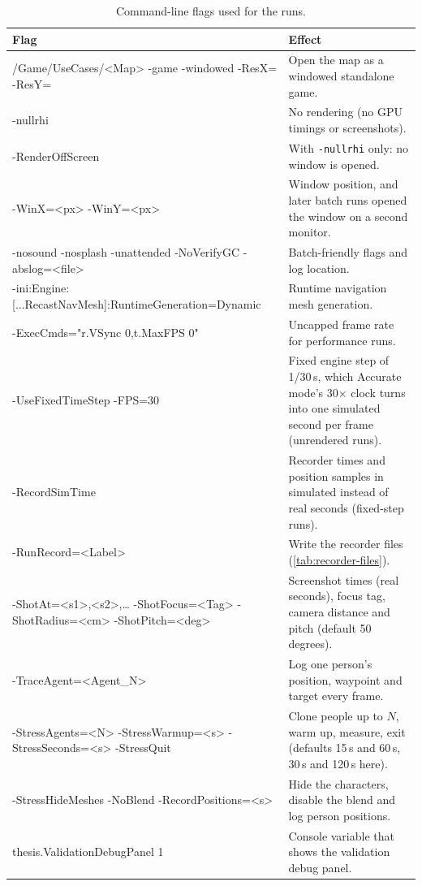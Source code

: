 \begin{table}[H]
\centering
\footnotesize
\begin{tabularx}{\textwidth}{|>{\raggedright\arraybackslash\ttfamily}p{}|>{\raggedright\arraybackslash}X|}
\hline
\rowcolor{headgray}\textbf{\rmfamily Flag} & \textbf{Effect} \\
\hline
/Game/UseCases/<Map> -game -windowed -ResX= -ResY= & Open the map as a windowed standalone game. \\ \hline
-nullrhi & No rendering (no GPU timings or screenshots). \\ \hline
-RenderOffScreen & With \texttt{-nullrhi} only: no window is opened. \\ \hline
-WinX=<px> -WinY=<px> & Window position, and later batch runs opened the window on a second monitor. \\ \hline
-nosound -nosplash -unattended -NoVerifyGC -abslog=<file> & Batch-friendly flags and log location. \\ \hline
-ini:Engine:[...RecastNavMesh]:\allowbreak RuntimeGeneration=Dynamic & Runtime navigation mesh generation. \\ \hline
-ExecCmds="r.VSync 0,t.MaxFPS 0" & Uncapped frame rate for performance runs. \\ \hline
-UseFixedTimeStep -FPS=30 & Fixed engine step of 1/30\,s, which Accurate mode's 30$\times$ clock turns into one simulated second per frame (unrendered runs). \\ \hline
-RecordSimTime & Recorder times and position samples in simulated instead of real seconds (fixed-step runs). \\ \hline
-RunRecord=<Label> & Write the recorder files (\cref{tab:recorder-files}). \\ \hline
-ShotAt=<s1>,<s2>,\dots{} -ShotFocus=<Tag> -ShotRadius=<cm> -ShotPitch=<deg> & Screenshot times (real seconds), focus tag, camera distance and pitch (default 50 degrees). \\ \hline
-TraceAgent=<Agent\_N> & Log one person's position, waypoint and target every frame. \\ \hline
-StressAgents=<N> -StressWarmup=<s> -StressSeconds=<s> -StressQuit & Clone people up to $N$, warm up, measure, exit (defaults 15\,s and 60\,s, 30\,s and 120\,s here). \\ \hline
-StressHideMeshes -NoBlend -RecordPositions=<s> & Hide the characters, disable the blend and log person positions. \\ \hline
thesis.ValidationDebugPanel 1 & Console variable that shows the validation debug panel. \\ \hline
\end{tabularx}
\caption[Command-line flags]{Command-line flags used for the runs.}
\label{tab:flags}
\end{table}

